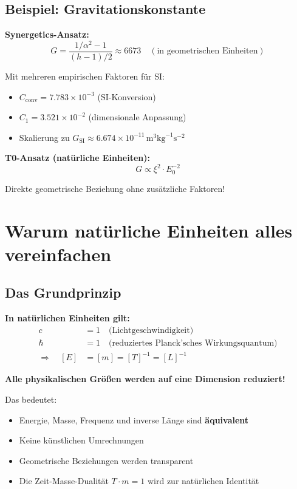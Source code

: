 \documentclass[12pt,a4paper]{article}
\newcommand{\xipar}{\xi}
\begin{document}
	\subsection{Beispiel: Gravitationskonstante}
	
	\textbf{Synergetics-Ansatz:}
	\begin{equation}
		G = \frac{1/\alpha^2 - 1}{(h - 1)/2} \approx 6673 \quad (\text{in geometrischen Einheiten})
	\end{equation}
	
	Mit mehreren empirischen Faktoren für SI:
	\begin{itemize}
		\item $C_{\text{conv}} = 7.783 \times 10^{-3}$ (SI-Konversion)
		\item $C_1 = 3.521 \times 10^{-2}$ (dimensionale Anpassung)
		\item Skalierung zu $G_{\text{SI}} \approx 6.674 \times 10^{-11} \, \text{m}^3 \text{kg}^{-1} \text{s}^{-2}$
	\end{itemize}
	
	\textbf{T0-Ansatz (natürliche Einheiten):}
	\begin{equation}
		\boxed{G \propto \xipar^2 \cdot E_0^{-2}}
	\end{equation}
	
	Direkte geometrische Beziehung ohne zusätzliche Faktoren!
	
	\section{Warum natürliche Einheiten alles vereinfachen}
	
	\subsection{Das Grundprinzip}
	
	\begin{vorteil}
		\textbf{In natürlichen Einheiten gilt:}
		\begin{align}
			c &= 1 \quad \text{(Lichtgeschwindigkeit)} \\
			\hbar &= 1 \quad \text{(reduziertes Planck'sches Wirkungsquantum)} \\
			\Rightarrow \quad [E] &= [m] = [T]^{-1} = [L]^{-1}
		\end{align}
		
		\textbf{Alle physikalischen Größen werden auf eine Dimension reduziert!}
		
		Das bedeutet:
		\begin{itemize}
			\item Energie, Masse, Frequenz und inverse Länge sind \textbf{äquivalent}
			\item Keine künstlichen Umrechnungen
			\item Geometrische Beziehungen werden transparent
			\item Die Zeit-Masse-Dualität $T \cdot m = 1$ wird zur natürlichen Identität
		\end{itemize}
	\end{vorteil}
	
\end{document}
